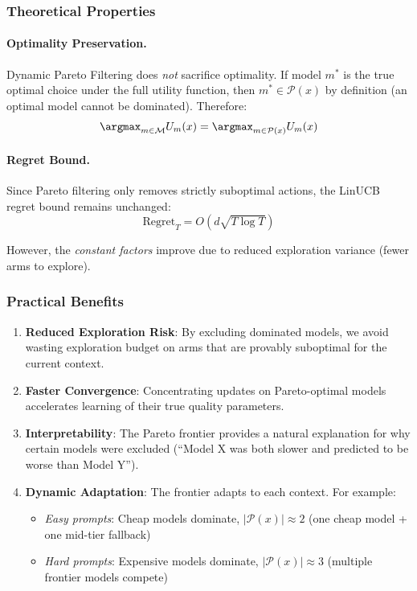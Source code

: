 \subsubsection{Theoretical Properties}

\paragraph{Optimality Preservation.}
Dynamic Pareto Filtering does \textit{not} sacrifice optimality. If model $m^*$ is the true optimal choice under the full utility function, then $m^* \in \mathcal{P}(x)$ by definition (an optimal model cannot be dominated). Therefore:
\begin{equation}
    \argmax_{m \in \mathcal{M}} U_m(x) = \argmax_{m \in \mathcal{P}(x)} U_m(x)
\end{equation}

\paragraph{Regret Bound.}
Since Pareto filtering only removes strictly suboptimal actions, the LinUCB regret bound remains unchanged:
\begin{equation}
    \text{Regret}_T = O\left( d \sqrt{T \log T} \right)
\end{equation}

However, the \textit{constant factors} improve due to reduced exploration variance (fewer arms to explore).

\subsubsection{Practical Benefits}

\begin{enumerate}
    \item \textbf{Reduced Exploration Risk}: By excluding dominated models, we avoid wasting exploration budget on arms that are provably suboptimal for the current context.
    
    \item \textbf{Faster Convergence}: Concentrating updates on Pareto-optimal models accelerates learning of their true quality parameters.
    
    \item \textbf{Interpretability}: The Pareto frontier provides a natural explanation for why certain models were excluded (``Model X was both slower and predicted to be worse than Model Y'').
    
    \item \textbf{Dynamic Adaptation}: The frontier adapts to each context. For example:
    \begin{itemize}
        \item \textit{Easy prompts}: Cheap models dominate, $|\mathcal{P}(x)| \approx 2$ (one cheap model + one mid-tier fallback)
        \item \textit{Hard prompts}: Expensive models dominate, $|\mathcal{P}(x)| \approx 3$ (multiple frontier models compete)
    \end{itemize}
\end{enumerate}

